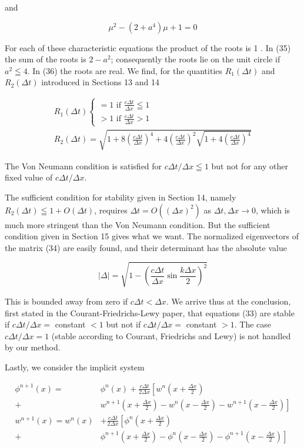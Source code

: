 \documentclass[10pt]{article}
\begin{document}
and

\[
\mu^{2}-\left(2+a^{4}\right) \mu+1=0
\]

For each of these characteristic equations the product of the roots is 1 . In (35) the sum of the roots is \(2-a^{2}\); consequently the roots lie on the unit circle if \(a^{2} \leqq 4\). In (36) the roots are real. We find, for the quantities \(R_{1}(\Delta t)\) and \(R_{2}(\Delta t)\) introduced in Sections 13 and 14

\[
\begin{gathered}
R_{1}(\Delta t)\left\{\begin{array}{l}
=1 \text { if } \frac{c \Delta t}{\Delta x} \leqq 1 \\
>1 \text { if } \frac{c \Delta t}{\Delta x}>1
\end{array}\right. \\
R_{2}(\Delta t)=\sqrt{1+8\left(\frac{c \Delta t}{\Delta x}\right)^{4}+4\left(\frac{c \Delta t}{\Delta x}\right)^{2} \sqrt{1+4\left(\frac{c \Delta t}{\Delta x}\right)^{4}}}
\end{gathered}
\]

The Von Neumann condition is satisfied for \(c \Delta t / \Delta x \leqq 1\) but not for any other fixed value of \(c \Delta t / \Delta x\).

The sufficient condition for stability given in Section 14, namely\\
\(R_{2}(\Delta t) \leqq 1+O(\Delta t)\), requires \(\Delta t=O\left((\Delta x)^{2}\right)\) as \(\Delta t, \Delta x \rightarrow 0\), which is much more stringent than the Von Neumann condition. But the sufficient condition given in Section 15 gives what we want. The normalized eigenvectors of the matrix (34) are easily found, and their determinant has the absolute value

\[
|\Delta|=\sqrt{1-\left(\frac{c \Delta t}{\Delta x} \sin \frac{k \Delta x}{2}\right)^{2}}
\]

This is bounded away from zero if \(c \Delta t<\Delta x\). We arrive thus at the conclusion, first stated in the Courant-Friedrichs-Lewy paper, that equations (33) are stable if \(c \Delta t / \Delta x=\) constant \(<1\) but not if \(c \Delta t / \Delta x=\) constant \(>1\). The case \(c \Delta t / \Delta x=1\) (stable according to Courant, Friedrichs and Lewy) is not handled by our method.

Lastly, we consider the implicit system

\[
\begin{aligned}
\phi^{n+1}(x)= & \phi^{n}(x)+\frac{c \Delta t}{2 \Delta x}\left[w^{n}\left(x+\frac{\Delta x}{2}\right)\right. \\
+ & \left.w^{n+1}\left(x+\frac{\Delta x}{2}\right)-w^{n}\left(x-\frac{\Delta x}{2}\right)-w^{n+1}\left(x-\frac{\Delta x}{2}\right)\right] \\
w^{n+1}(x)=w^{n}(x) & +\frac{c \Delta t}{2 \Delta x}\left[\phi^{n}\left(x+\frac{\Delta x}{2}\right)\right. \\
+ & \left.\phi^{n+1}\left(x+\frac{\Delta x}{2}\right)-\phi^{n}\left(x-\frac{\Delta x}{2}\right)-\phi^{n+1}\left(x-\frac{\Delta x}{2}\right)\right]
\end{aligned}
\]
\end{document}
